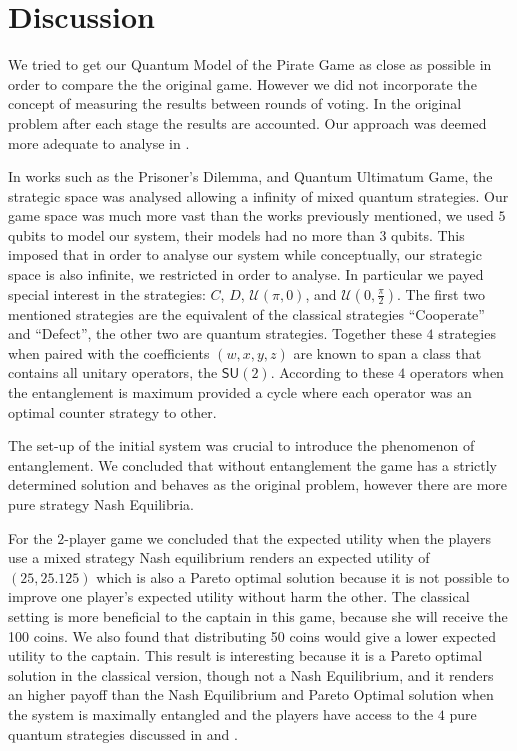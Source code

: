 \clearpage
\section{Discussion}
\label{subsec:3playergame:discution}



We tried to get our Quantum Model of the Pirate Game as close as possible in order to compare the the original game. However we did not incorporate the concept of measuring the results between rounds of voting. In the original problem after each stage the results are accounted. Our approach was deemed more adequate to analyse in \cite{Fra2011}.

In works such as the Prisoner's Dilemma\cite{Letters2002}\cite{Eisert2008}, and Quantum Ultimatum Game\cite{Fra2011}, the strategic space was analysed allowing a infinity of mixed quantum strategies. Our game space was much more vast than the works previously mentioned, we used $5$ qubits to model our system, their models had no more than $3$ qubits. This imposed that in order to analyse our system while conceptually, our strategic space is also infinite, we restricted in order to analyse. In particular we payed special interest in the strategies: $C$, $D$, $\mathcal{U}(\pi, 0)$, and $\mathcal{U}(0, \frac{\pi}{2})$. The first two mentioned strategies are the equivalent of the classical strategies ``Cooperate'' and ``Defect'', the other two are quantum strategies. Together these $4$ strategies when paired with the coefficients $(w,x,y,z)$ are known to span a class that contains all unitary operators, the $\mathsf{SU}(2)$. According to \cite{Du} these $4$ operators when the entanglement is maximum provided a cycle where each operator was an optimal counter strategy to other. 

The set-up of the initial system was crucial to introduce the phenomenon of entanglement. We concluded that without entanglement the game has a strictly determined solution and behaves as the original problem, however there are more pure strategy Nash Equilibria.

For the $2$-player game we concluded that the expected utility when the players use a mixed strategy Nash equilibrium renders an expected utility of $(25, 25.125)$ which is also a Pareto optimal solution because it is not possible to improve one player's expected utility without harm the other. The classical setting is more beneficial to the captain in this game, because she will receive the 100 coins. We also found that distributing 50 coins would give a lower expected utility to the captain. This result is interesting because it is a Pareto optimal solution in the classical version, though not a Nash Equilibrium, and it renders an higher payoff than the Nash Equilibrium and Pareto Optimal solution when the system is maximally entangled and the players have access to the $4$ pure quantum strategies discussed in \cite{Du} and \cite{Letters2002}. 

